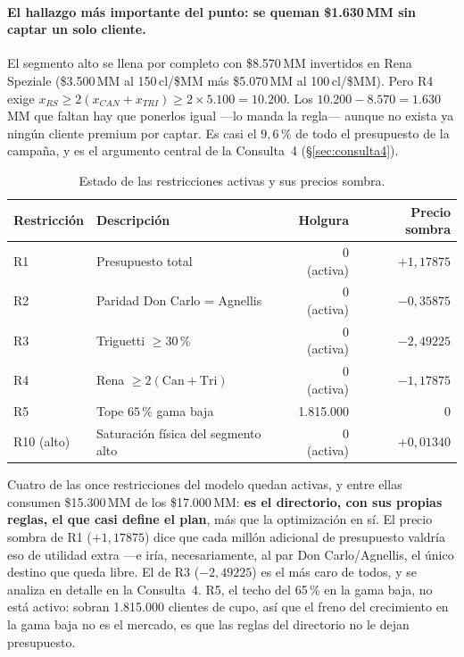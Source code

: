 \documentclass[10pt,a4paper]{article}
\begin{document}
\paragraph{El hallazgo más importante del punto: se queman \$1.630\,MM sin
captar un solo cliente.} El segmento alto se llena por completo con
\$8.570\,MM invertidos en Rena Speziale (\$3.500\,MM al 150\,cl/\$MM más
\$5.070\,MM al 100\,cl/\$MM). Pero R4 exige
$x_{RS}\geq 2(x_{CAN}+x_{TRI})\geq 2\times 5.100=10.200$. Los
$10.200-8.570=1.630\,$MM que faltan hay que ponerlos igual —lo manda la
regla— aunque no exista ya ningún cliente premium por captar. Es casi el
$9,6\,\%$ de todo el presupuesto de la campaña, y es el argumento central de
la Consulta~4 (\S\ref{sec:consulta4}).

\begin{table}[htbp]
\centering\small
\caption{Estado de las restricciones activas y sus precios sombra.}
\label{tab:duales}
\begin{tabular}{llrr}
\toprule
Restricción & Descripción & Holgura & Precio sombra \\
\midrule
R1 & Presupuesto total & 0 (activa) & $+1{,}17875$ \\
R2 & Paridad Don Carlo = Agnellis & 0 (activa) & $-0{,}35875$ \\
R3 & Triguetti $\geq 30\,\%$ & 0 (activa) & $-2{,}49225$ \\
R4 & Rena $\geq 2(\text{Can}+\text{Tri})$ & 0 (activa) & $-1{,}17875$ \\
R5 & Tope $65\,\%$ gama baja & 1.815.000 & 0 \\
R10 (alto) & Saturación física del segmento alto & 0 (activa) & $+0{,}01340$ \\
\bottomrule
\end{tabular}
\end{table}

Cuatro de las once restricciones del modelo quedan activas, y entre ellas
consumen \$15.300\,MM de los \$17.000\,MM: \textbf{es el directorio, con sus
propias reglas, el que casi define el plan}, más que la optimización en sí.
El precio sombra de R1 ($+1{,}17875$) dice que cada millón adicional de
presupuesto valdría eso de utilidad extra —e iría, necesariamente, al par
Don Carlo/Agnellis, el único destino que queda libre. El de R3
($-2{,}49225$) es el más caro de todos, y se analiza en detalle en la
Consulta~4. R5, el techo del 65\,\% en la gama baja, no está activo: sobran
1.815.000 clientes de cupo, así que el freno del crecimiento en la gama baja
no es el mercado, es que las reglas del directorio no le dejan presupuesto.
\end{document}
